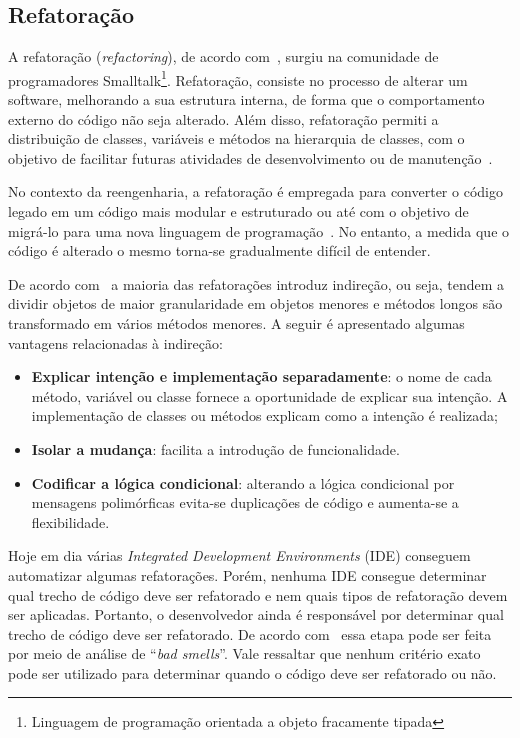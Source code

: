 \subsection{Refatoração}\label{sub:refatoracao}

A refatoração (\textit{refactoring}), de acordo com~\citet{refactImpro}, surgiu na comunidade de programadores Smalltalk\footnote{Linguagem de programação orientada a objeto fracamente tipada}. Refatoração, consiste no processo de alterar um software, melhorando a sua estrutura interna, de forma que o comportamento externo do código não seja alterado. Além disso, refatoração permiti a distribuição de classes, variáveis e métodos na hierarquia de classes, com o objetivo de facilitar futuras atividades de desenvolvimento ou de manutenção~\cite{Opdy92b, refactImpro, Demeyer1, Mens04}.

No contexto da reengenharia, a refatoração é empregada para converter o código legado em um código mais modular e estruturado ou até com o objetivo de migrá-lo para uma nova linguagem de programação~\cite{Mens04}. No entanto, a medida que o código é alterado o mesmo torna-se gradualmente difícil de entender.

De acordo com~\citet{refactImpro} a maioria das refatorações introduz indireção, ou seja, tendem a dividir objetos de maior granularidade em objetos menores e métodos longos são transformado em vários métodos menores. A seguir é apresentado algumas vantagens relacionadas à indireção:

\begin{itemize}
\item \textbf{Explicar intenção e implementação separadamente}: o nome de cada método, variável ou classe fornece a oportunidade de explicar sua intenção. A implementação de classes ou métodos explicam como a intenção é realizada;
\item \textbf{Isolar a mudança}: facilita a introdução de funcionalidade.
\item \textbf{Codificar a lógica condicional}: alterando a lógica condicional por mensagens polimórficas evita-se duplicações de código e aumenta-se a flexibilidade.
\end{itemize}    

Hoje em dia várias \textit{Integrated Development Environments} (IDE) conseguem automatizar algumas refatorações. Porém, nenhuma IDE consegue determinar qual trecho de código deve ser refatorado e nem quais tipos de refatoração devem ser aplicadas. Portanto, o desenvolvedor ainda é responsável por determinar qual trecho de código deve ser refatorado. De acordo com~\citet{refactImpro} essa etapa pode ser feita por meio de análise de ``\textit{bad smells}''. Vale ressaltar que nenhum critério exato pode ser utilizado para determinar quando o código deve ser refatorado ou não. 

